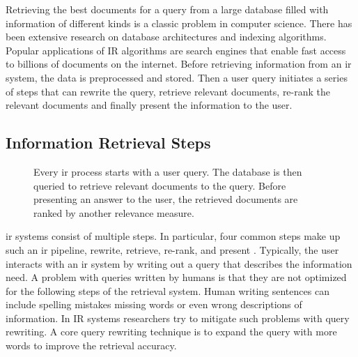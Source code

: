 \documentclass[../main.tex]{subfiles}
\begin{document}
Retrieving the best documents for a query from a large database
filled with information of different kinds is a classic problem in computer science.
There has been extensive research on database architectures and indexing algorithms.
Popular applications of IR algorithms are search engines
that enable fast access to billions of documents on the internet.
Before retrieving information from an \gls{ir} system,
the data is preprocessed and stored.
Then a user query initiates a series of steps that can rewrite the query,
retrieve relevant documents,
re-rank the relevant documents and finally present the information to the user.

\subsection{Information Retrieval Steps}

\begin{figure}[t]
    \centering
    \caption{Every \gls{ir} process starts with a user query.
        The database is then queried to retrieve relevant documents to the query.
        Before presenting an answer to the user, the retrieved documents are ranked by another relevance measure.}
    \label{fig:ir_steps}
\end{figure}
\Gls{ir} systems consist of multiple steps.
In particular, four common steps make up such an \gls{ir} pipeline,
rewrite, retrieve, re-rank, and present \cite{Zhu2024}.
Typically, the user interacts with an \gls{ir} system
by writing out a query that describes the information need.
A problem with queries written by humans is that they are not optimized for the following steps of the retrieval system.
Human writing sentences can include spelling mistakes missing words or even wrong descriptions of information.
In IR systems researchers try to mitigate such problems with query rewriting.
A core query rewriting technique is to expand the query with more words to improve the retrieval accuracy.
\end{document}

